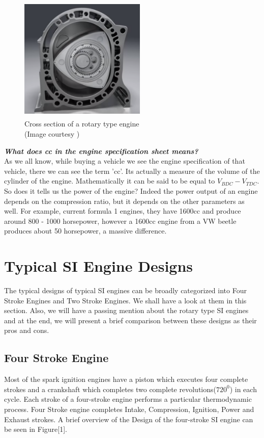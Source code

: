 \documentclass[11pt]{article}
\begin{document}
\begin{center}
        \begin{figure}[!h]
        \centering
          \includegraphics[width=60mm, height=60mm]{rotary.PNG}
          \caption{Cross section of a rotary type engine\\ (Image courtesy \cite{ref13})
          }
          \label{fig:Piston}
        \end{figure}
\end{center}

\textbf{\textit{What does cc in the engine specification sheet means?}}\\
As we all know, while buying a vehicle we see the engine specification of that vehicle, there we can see the term 'cc'. Its actually a measure of the volume of the cylinder of the engine. Mathematically it can be said to be equal to  \(V_{BDC}-V_{TDC}\). So does it tells us the power of the engine? Indeed the power output of an engine depends on the compression ratio, but it depends on the other parameters as well. For example, current formula 1 engines, they have 1600cc and produce around 800 - 1000 horsepower, however a 1600cc engine from a VW beetle produces about 50 horsepower, a massive difference.

\section{Typical SI Engine Designs}

The typical designs of typical SI engines can be broadly categorized into Four Stroke Engines and Two Stroke Engines. We shall have a look at them in this section. Also, we will have a passing mention about the rotary type SI engines and at the end, we will present a brief comparison between these designs as their pros and cons.

\subsection{Four Stroke Engine}
Most of the spark ignition engines have a piston which executes four complete strokes and a crankshaft which completes two complete revolutions(${720^0}$) in each cycle. Each stroke of a four-stroke engine performs a particular thermodynamic process. Four Stroke engine completes Intake, Compression, Ignition, 
Power and Exhaust strokes.
 A brief overview of the Design of the four-stroke SI engine can be seen in Figure[1].\\
\end{document}
